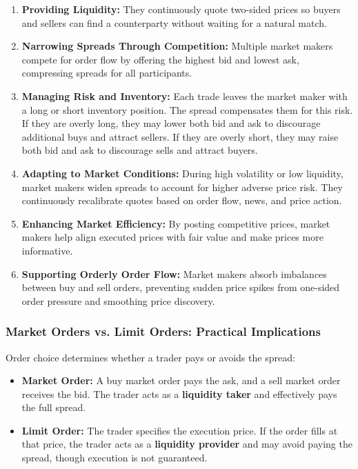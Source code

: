 \documentclass[12pt,openany]{book}
\begin{document}
\begin{enumerate}[leftmargin=*]
    \item \textbf{Providing Liquidity:} They continuously quote two-sided prices so buyers and sellers can find a counterparty without waiting for a natural match.
    \item \textbf{Narrowing Spreads Through Competition:} Multiple market makers compete for order flow by offering the highest bid and lowest ask, compressing spreads for all participants.
    \item \textbf{Managing Risk and Inventory:} Each trade leaves the market maker with a long or short inventory position. The spread compensates them for this risk. If they are overly long, they may lower both bid and ask to discourage additional buys and attract sellers. If they are overly short, they may raise both bid and ask to discourage sells and attract buyers.
    \item \textbf{Adapting to Market Conditions:} During high volatility or low liquidity, market makers widen spreads to account for higher adverse price risk. They continuously recalibrate quotes based on order flow, news, and price action.
    \item \textbf{Enhancing Market Efficiency:} By posting competitive prices, market makers help align executed prices with fair value and make prices more informative.
    \item \textbf{Supporting Orderly Order Flow:} Market makers absorb imbalances between buy and sell orders, preventing sudden price spikes from one-sided order pressure and smoothing price discovery.
\end{enumerate}

\subsubsection{Market Orders vs. Limit Orders: Practical Implications}
Order choice determines whether a trader pays or avoids the spread:

\begin{itemize}[leftmargin=*]
    \item \textbf{Market Order:} A buy market order pays the ask, and a sell market order receives the bid. The trader acts as a \textbf{liquidity taker} and effectively pays the full spread.
    \item \textbf{Limit Order:} The trader specifies the execution price. If the order fills at that price, the trader acts as a \textbf{liquidity provider} and may avoid paying the spread, though execution is not guaranteed.
\end{itemize}
\end{document}
